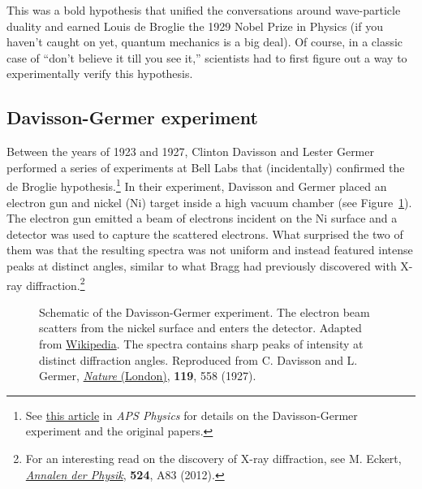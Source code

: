 This was a bold hypothesis that unified the conversations around wave-particle duality and earned Louis de Broglie the 1929 Nobel Prize in Physics (if you haven't caught on yet, quantum mechanics is a big deal). Of course, in a classic case of ``don't believe it till you see it,'' scientists had to first figure out a way to experimentally verify this hypothesis.


\subsection{Davisson-Germer experiment}
Between the years of 1923 and 1927, Clinton Davisson and Lester Germer performed a series of experiments at Bell Labs that (incidentally) confirmed the de Broglie hypothesis.\footnote{See \href{https://physics.aps.org/story/v17/st17}{this article} in \emph{APS Physics} for details on the Davisson-Germer experiment and the original papers.} In their experiment, Davisson and Germer placed an electron gun and nickel (Ni) target inside a high vacuum chamber (see Figure~\ref{fig:DG}). The electron gun emitted a beam of electrons incident on the Ni surface and a detector was used to capture the scattered electrons. What surprised the two of them was that the resulting spectra was not uniform and instead featured intense peaks at distinct angles, similar to what Bragg had previously discovered with X-ray diffraction.\footnote{For an interesting read on the discovery of X-ray diffraction, see M. Eckert, \href{http://onlinelibrary.wiley.com/doi/10.1002/andp.201200724/full}{\emph{Annalen der Physik}}, \textbf{524}, A83 (2012).} \par

\begin{figure}[!h]
	\centering
	\caption{\protect{} Schematic of the Davisson-Germer experiment. The electron beam scatters from the nickel surface and enters the detector. Adapted from \href{https://en.wikipedia.org/wiki/Davisson\%E2\%80\%93Germer\_experiment}{Wikipedia}. \protect{} The spectra contains sharp peaks of intensity at distinct diffraction angles. Reproduced from C. Davisson and L. Germer, \href{https://www.nature.com/nature/journal/v119/n2998/pdf/119558a0.pdf}{\emph{Nature} (London)}, \textbf{119}, 558 (1927).}
	\label{fig:DG}
\end{figure}

